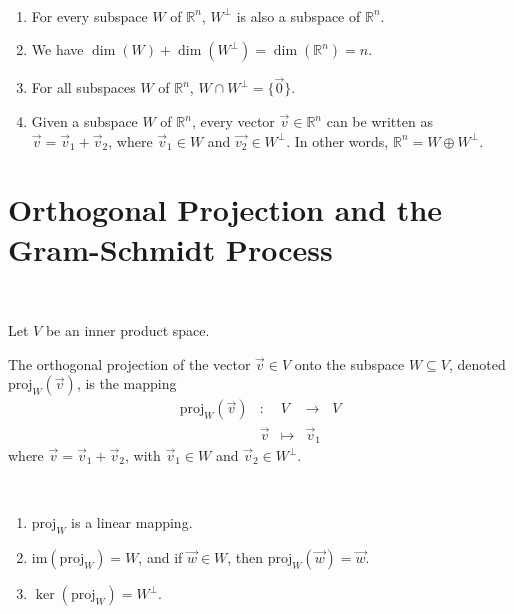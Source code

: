 \documentclass[11pt,fleqn]{book} %
\begin{document}
\setcounter{chapter}{4}
\setcounter{section}{4}
\setcounter{dummy}{2}
\begin{proposition}
{~~~}

    \begin{enumerate}[label=\alph*)]
        \item For every subspace $W$ of $\mathbb{R}^n$, $W^\perp$ is also a subspace of $\mathbb{R}^n$.
        \item We have $\dim(W) + \dim(W^\perp) = \dim(\mathbb{R}^n) = n$.
        \item For all subspaces $W$ of $\mathbb{R}^n$, $W \cap W^\perp = \{ \vec{0} \}$.
        \item Given a subspace $W$ of $\mathbb{R}^n$, every vector $\vec{v} \in \mathbb{R}^n$ can be written  as $\vec{v} = \vec{v}_1 + \vec{v}_2$, where $\vec{v}_1 \in W$ and $\vec{v_2} \in W^\perp$. In other words, $\mathbb{R}^n = W \oplus W^\perp$.
    \end{enumerate}
\end{proposition}
\setcounter{section}{3}
\setcounter{chapter}{3}

\section{Orthogonal Projection and the Gram-Schmidt Process}

\setcounter{section}{0}
\setcounter{definitionT}{3}
\begin{definition}
{~~~}

    Let $V$ be an inner product space. 
    
    The orthogonal projection of the vector $\vec{v} \in V$ onto the subspace $W \subseteq V$, denoted $\mathrm{proj}_W(\vec{v})$, is the mapping $$\begin{matrix} \mathrm{proj}_W(\vec{v})&: &V &\to &V \\ &\vec{v} &\mapsto &\vec{v}_1 \end{matrix}$$ where $\vec{v} = \vec{v}_1 + \vec{v}_2$, with $\vec{v}_1 \in W$ and $\vec{v}_2 \in W^\perp$. 
\end{definition}
\setcounter{section}{4}

\setcounter{chapter}{4}
\setcounter{dummy}{4}
\begin{proposition}
{~~~}

    \begin{enumerate}[label=\alph*)]
        \item $\mathrm{proj}_W$ is a linear mapping.
        \item $\mathrm{im}(\mathrm{proj}_W) = W$, and if $\vec{w} \in W$, then $\mathrm{proj}_W(\vec{w}) = \vec{w}$.
        \item $\ker(\mathrm{proj}_W) = W^\perp$. 
    \end{enumerate}
\end{proposition}
\end{document}
